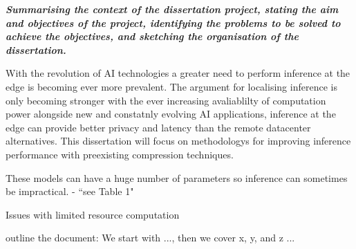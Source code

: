 \documentclass[../D1.tex]{subfiles}
\begin{document}
\emph{\textbf{Summarising the context of the dissertation project, stating the aim and objectives of the project, 
identifying the problems to be solved to achieve the objectives, and sketching the organisation of the dissertation.}}

With the revolution of AI technologies a greater need to perform inference at the edge is becoming ever more prevalent. The argument for localising inference is only becoming stronger with the ever increasing avaliablilty of computation power alongside new and constatnly evolving AI applications, inference at the edge can provide better privacy and latency than the remote datacenter alternatives.  
This dissertation will focus on methodologys for improving inference performance with preexisting compression techniques.

These models can have a huge number of parameters so inference can sometimes be impractical.
\autocite{chenDeepLearningMobile2020} - ``see Table 1"

Issues with limited resource computation \autocite{szeEfficientProcessingDeep2017}

outline the document: We start with ..., then we cover x, y, and z ...
\end{document}
